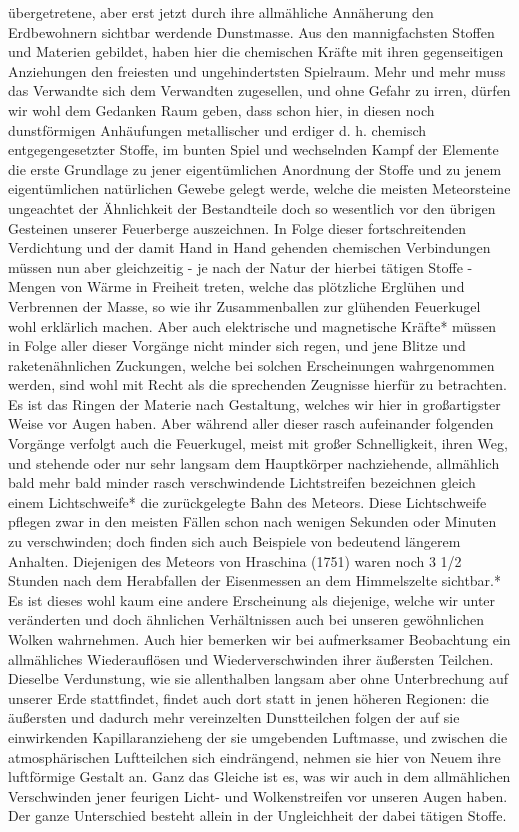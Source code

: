 \documentclass[a4paper, 11pt, oneside, polutonikogreek, german]{article}
\begin{document}
übergetretene, aber erst jetzt durch ihre allmähliche Annäherung den Erdbewohnern sichtbar werdende Dunstmasse. Aus den mannigfachsten Stoffen und Materien gebildet, haben hier die chemischen Kräfte mit ihren gegenseitigen Anziehungen den freiesten und ungehindertsten Spielraum. Mehr und mehr muss das Verwandte sich dem Verwandten zugesellen, und ohne Gefahr zu irren, dürfen wir wohl dem Gedanken Raum geben, dass schon hier, in diesen noch dunstförmigen Anhäufungen metallischer und erdiger d. h. chemisch entgegengesetzter Stoffe, im bunten Spiel und wechselnden Kampf der Elemente die erste Grundlage zu jener eigentümlichen Anordnung der Stoffe und zu jenem eigentümlichen natürlichen Gewebe gelegt werde, welche die meisten Meteorsteine ungeachtet der Ähnlichkeit der Bestandteile doch so wesentlich vor den übrigen Gesteinen unserer Feuerberge auszeichnen. In Folge dieser fortschreitenden Verdichtung und der damit Hand in Hand gehenden chemischen Verbindungen müssen nun aber gleichzeitig - je nach der Natur der hierbei tätigen Stoffe - Mengen von Wärme in Freiheit treten, welche das plötzliche Erglühen und Verbrennen der Masse, so wie ihr Zusammenballen zur glühenden Feuerkugel wohl erklärlich machen. Aber auch elektrische und magnetische Kräfte* müssen in Folge aller dieser Vorgänge nicht minder sich regen, und jene Blitze und raketenähnlichen Zuckungen, welche bei solchen Erscheinungen wahrgenommen werden, sind wohl mit Recht als die sprechenden Zeugnisse hierfür zu betrachten. Es ist das Ringen der Materie nach Gestaltung, welches wir hier in großartigster Weise vor Augen haben. Aber während aller dieser rasch aufeinander folgenden Vorgänge verfolgt auch die Feuerkugel, meist mit großer Schnelligkeit, ihren Weg, und stehende oder nur sehr langsam dem Hauptkörper nachziehende, allmählich bald mehr bald minder rasch verschwindende Lichtstreifen bezeichnen gleich einem Lichtschweife* die zurückgelegte Bahn des Meteors. Diese Lichtschweife pflegen zwar in den meisten Fällen schon nach wenigen Sekunden oder Minuten zu verschwinden; doch finden sich auch Beispiele von bedeutend längerem Anhalten. Diejenigen des Meteors von Hraschina (1751) waren noch 3 1/2 Stunden nach dem Herabfallen der Eisenmessen an dem Himmelszelte sichtbar.* Es ist dieses wohl kaum eine andere Erscheinung als diejenige, welche wir unter veränderten und doch ähnlichen Verhältnissen auch bei unseren gewöhnlichen Wolken wahrnehmen. Auch hier bemerken wir bei aufmerksamer Beobachtung ein allmähliches Wiederauflösen und Wiederverschwinden ihrer äußersten Teilchen. Dieselbe Verdunstung, wie sie allenthalben langsam aber ohne Unterbrechung auf unserer Erde stattfindet, findet auch dort statt in jenen höheren Regionen: die äußersten und dadurch mehr vereinzelten Dunstteilchen folgen der auf sie einwirkenden Kapillaranzieheng der sie umgebenden Luftmasse, und zwischen die atmosphärischen Luftteilchen sich eindrängend, nehmen sie hier von Neuem ihre luftförmige Gestalt an. Ganz das Gleiche ist es, was wir auch in dem allmählichen Verschwinden jener feurigen Licht- und Wolkenstreifen vor unseren Augen haben. Der ganze Unterschied besteht allein in der Ungleichheit der dabei tätigen Stoffe.
\end{document}
